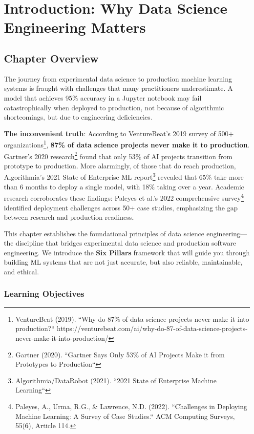 \chapter{Introduction: Why Data Science Engineering Matters}
\label{ch:introduction}

\section{Chapter Overview}

The journey from experimental data science to production machine learning systems is fraught with challenges that many practitioners underestimate. A model that achieves 95\% accuracy in a Jupyter notebook may fail catastrophically when deployed to production, not because of algorithmic shortcomings, but due to engineering deficiencies.

\textbf{The inconvenient truth}: According to VentureBeat's 2019 survey of 500+ organizations\footnote{VentureBeat (2019). ``Why do 87\% of data science projects never make it into production?`` https://venturebeat.com/ai/why-do-87-of-data-science-projects-never-make-it-into-production/}, \textbf{87\% of data science projects never make it to production}. Gartner's 2020 research\footnote{Gartner (2020). ``Gartner Says Only 53\% of AI Projects Make it from Prototypes to Production``} found that only 53\% of AI projects transition from prototype to production. More alarmingly, of those that do reach production, Algorithmia's 2021 State of Enterprise ML report\footnote{Algorithmia/DataRobot (2021). ``2021 State of Enterprise Machine Learning``} revealed that 65\% take more than 6 months to deploy a single model, with 18\% taking over a year. Academic research corroborates these findings: Paleyes et al.'s 2022 comprehensive survey\footnote{Paleyes, A., Urma, R.G., \& Lawrence, N.D. (2022). ``Challenges in Deploying Machine Learning: A Survey of Case Studies.`` ACM Computing Surveys, 55(6), Article 114.} identified deployment challenges across 50+ case studies, emphasizing the gap between research and production readiness.

This chapter establishes the foundational principles of data science engineering---the discipline that bridges experimental data science and production software engineering. We introduce the \textbf{Six Pillars} framework that will guide you through building ML systems that are not just accurate, but also reliable, maintainable, and ethical.

\subsection{Learning Objectives}

